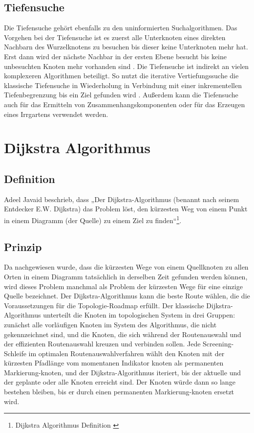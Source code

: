 \subsection{Tiefensuche}
\label{Tiefensuche}
Die Tiefensuche gehört ebenfalls zu den uninformierten Suchalgorithmen.
Das Vorgehen bei der Tiefensuche ist es zuerst alle Unterknoten eines direkten Nachbarn des Wurzelknotens zu besuchen bis dieser keine Unterknoten mehr hat.
Erst dann wird der nächste Nachbar in der ersten Ebene besucht bis keine unbesuchten Knoten mehr vorhanden sind \cite{Russell:10c}. Die Tiefensuche ist indirekt an vielen 
komplexeren Algorithmen beteiligt. 
So nutzt die iterative Vertiefungssuche die klassische Tiefensuche in Wiederholung in Verbindung mit einer inkrementellen Tiefenbegrenzung bis ein Ziel gefunden wird \cite{Russell:10d}.
Außerdem kann die Tiefensuche auch für das Ermitteln von Zusammenhangskomponenten
oder für das Erzeugen eines Irrgartens verwendet werden\cite{Russell:10c}.

\section{Dijkstra Algorithmus}
\label{Dijkstra Algorithmus}
\subsection{Definition}

Adeel Javaid beschrieb, dass „Der Dijkstra-Algorithmus (benannt nach seinem Entdecker E.W. Dijkstra) das Problem löst, den kürzesten Weg von einem Punkt in einem Diagramm (der Quelle) zu einem Ziel zu finden“\footnote{Dijkstra Algorithmus Definition \cite{Javaid2019}}.

\subsection{Prinzip}

Da nachgewiesen wurde, dass die kürzesten Wege von einem Quellknoten zu allen Orten in einem Diagramm tatsächlich in derselben Zeit gefunden werden können, wird dieses Problem manchmal als Problem der kürzesten Wege für eine einzige Quelle bezeichnet\cite{Javaid2019}.
\newline
\newline
Der Dijkstra-Algorithmus kann die beste Route wählen, die die Voraussetzungen für die Topologie-Roadmap erfüllt. Der klassische Dijkstra-Algorithmus unterteilt die Knoten im topologischen System in drei Gruppen: zunächst alle vorläufigen Knoten im System des Algorithmus, die nicht gekennzeichnet sind, und die Knoten, die sich während der Routenauswahl und der effizienten Routenauswahl kreuzen und verbinden sollen. Jede Screening-Schleife im optimalen Routenauswahlverfahren wählt den Knoten mit der kürzesten Pfadlänge vom momentanen Indikator knoten als permanenten Markierung-knoten, und der Dijkstra-Algorithmus iteriert, bis der aktuelle und der geplante oder alle Knoten erreicht sind. Der Knoten würde dann so lange bestehen bleiben, bis er durch einen permanenten Markierung-knoten ersetzt wird\cite{Zhou2013}.


